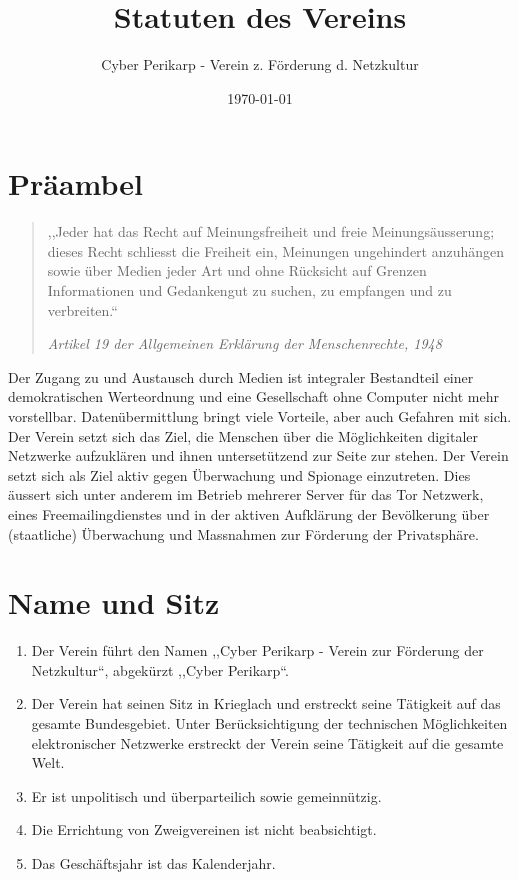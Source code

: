 \documentclass[a4paper,12pt]{article}
\title{Statuten des Vereins}
\author{Cyber Perikarp - Verein z. Förderung d. Netzkultur}
\date{\today}
\newcommand*{\zitat}[2]{%
   \normalfont
	 \small
   \begin{quote} ,,#1``\par
   	\textit{#2}
   \end{quote}
   \normalsize
}
\begin{document}
	\maketitle
	\section{Präambel}
		\label{sec:vorwort}
		\zitat{Jeder hat das Recht auf Meinungsfreiheit und freie Meinungsäusserung; dieses Recht schliesst die Freiheit ein, Meinungen ungehindert anzuhängen sowie über Medien jeder Art und ohne Rücksicht auf Grenzen Informationen und Gedankengut zu suchen, zu empfangen und zu verbreiten.}{Artikel 19 der Allgemeinen Erklärung der Menschenrechte, 1948}
		Der Zugang zu und Austausch durch Medien ist integraler Bestandteil einer demokratischen Werteordnung und eine Gesellschaft ohne Computer nicht mehr vorstellbar. Datenübermittlung bringt viele Vorteile, aber auch Gefahren mit sich. Der Verein setzt sich das Ziel, die Menschen über die Möglichkeiten digitaler Netzwerke aufzuklären und ihnen untersetützend zur Seite zur stehen. Der Verein setzt sich als Ziel aktiv gegen Überwachung und Spionage einzutreten. Dies äussert sich unter anderem im Betrieb mehrerer Server für das Tor Netzwerk, eines Freemailingdienstes und in der aktiven Aufklärung der Bevölkerung über (staatliche) Überwachung und Massnahmen zur Förderung der Privatsphäre.

	\section{Name und Sitz}
		\label{sec:name}
		\begin{enumerate}
			\item Der Verein führt den Namen ,,Cyber Perikarp - Verein zur Förderung der Netzkultur``, abgekürzt ,,Cyber Perikarp``.
			\item Der Verein hat seinen Sitz in Krieglach und erstreckt seine Tätigkeit auf das gesamte Bundesgebiet. Unter Berücksichtigung der technischen Möglichkeiten elektronischer Netzwerke erstreckt der Verein seine Tätigkeit auf die gesamte Welt.
			\item Er ist unpolitisch und überparteilich sowie gemeinnützig.
			\item Die Errichtung von Zweigvereinen ist nicht beabsichtigt.
			\item Das Geschäftsjahr ist das Kalenderjahr.
		\end{enumerate}
\end{document}
